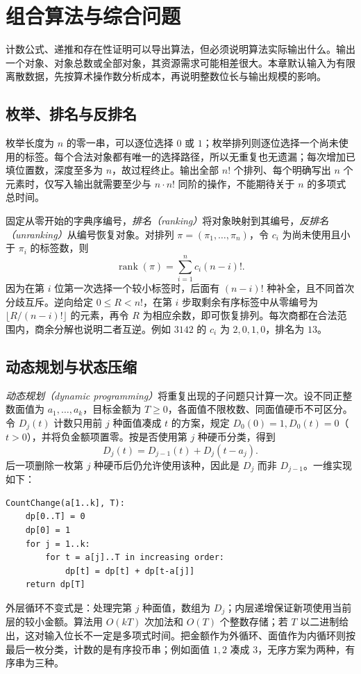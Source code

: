 \setcounter{chapter}{16} %
\chapter{组合算法与综合问题}
\label{ch:algorithms}

计数公式、递推和存在性证明可以导出算法，但必须说明算法实际输出什么。输出一个对象、对象总数或全部对象，其资源需求可能相差很大。本章默认输入为有限离散数据，先按算术操作数分析成本，再说明整数位长与输出规模的影响。

\section{枚举、排名与反排名}

枚举长度为 $n$ 的零一串，可以逐位选择 $0$ 或 $1$；枚举排列则逐位选择一个尚未使用的标签。每个合法对象都有唯一的选择路径，所以无重复也无遗漏；每次增加已填位置数，深度至多为 $n$，故过程终止。输出全部 $n!$ 个排列、每个明确写出 $n$ 个元素时，仅写入输出就需要至少与 $n\cdot n!$ 同阶的操作，不能期待关于 $n$ 的多项式总时间。

固定从零开始的字典序编号，\emph{排名（ranking）}将对象映射到其编号，\emph{反排名（unranking）}从编号恢复对象。对排列 $\pi=(\pi_1,\ldots,\pi_n)$，令 $c_i$ 为尚未使用且小于 $\pi_i$ 的标签数，则
\[
 \operatorname{rank}(\pi)=\sum_{i=1}^n c_i(n-i)!.
\]
因为在第 $i$ 位第一次选择一个较小标签时，后面有 $(n-i)!$ 种补全，且不同首次分歧互斥。逆向给定 $0\le R<n!$，在第 $i$ 步取剩余有序标签中从零编号为 $\lfloor R/(n-i)!\rfloor$ 的元素，再令 $R$ 为相应余数，即可恢复排列。每次商都在合法范围内，商余分解也说明二者互逆。例如 $3142$ 的 $c_i$ 为 $2,0,1,0$，排名为 $13$。

\section{动态规划与状态压缩}

\emph{动态规划（dynamic programming）}将重复出现的子问题只计算一次。设不同正整数面值为 $a_1,\ldots,a_k$，目标金额为 $T\ge0$，各面值不限枚数、同面值硬币不可区分。令 $D_j(t)$ 计数只用前 $j$ 种面值凑成 $t$ 的方案，规定 $D_0(0)=1,D_0(t)=0$（$t>0$），并将负金额项置零。按是否使用第 $j$ 种硬币分类，得到
\[
 D_j(t)=D_{j-1}(t)+D_j(t-a_j).
\]
后一项删除一枚第 $j$ 种硬币后仍允许使用该种，因此是 $D_j$ 而非 $D_{j-1}$。一维实现如下：
\begin{verbatim}
CountChange(a[1..k], T):
    dp[0..T] = 0
    dp[0] = 1
    for j = 1..k:
        for t = a[j]..T in increasing order:
            dp[t] = dp[t] + dp[t-a[j]]
    return dp[T]
\end{verbatim}
外层循环不变式是：处理完第 $j$ 种面值，数组为 $D_j$；内层递增保证新项使用当前层的较小金额。算法用 $O(kT)$ 次加法和 $O(T)$ 个整数存储；若 $T$ 以二进制给出，这对输入位长不一定是多项式时间。把金额作为外循环、面值作为内循环则按最后一枚分类，计数的是有序投币串；例如面值 $1,2$ 凑成 $3$，无序方案为两种，有序串为三种。

